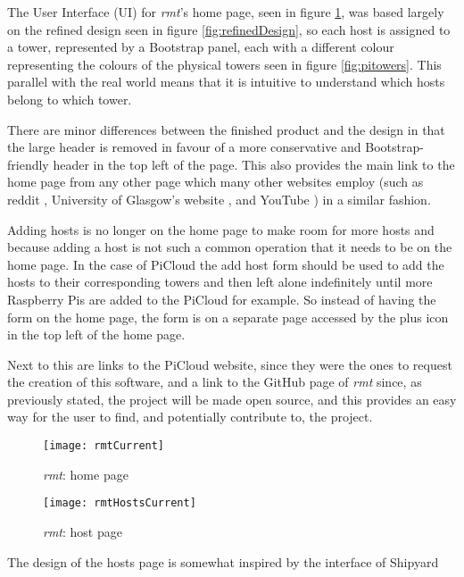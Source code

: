 \label{sec:implUi}
The User Interface (UI) for \emph{rmt}'s home page, seen in figure \ref{fig:rmtCurrent}, was based largely on the refined design seen in figure \ref{fig:refinedDesign}, so each host is assigned to a tower, represented by a Bootstrap panel, each with a different colour representing the colours of the physical towers seen in figure \ref{fig:pitowers}.
This parallel with the real world means that it is intuitive to understand which hosts belong to which tower.

There are minor differences between the finished product and the design in that the large header is removed in favour of a more conservative and Bootstrap-friendly header in the top left of the page.
This also provides the main link to the home page from any other page which many other websites employ (such as reddit \citep{reddit}, University of Glasgow's website \citep{glaWebsite}, and YouTube \citep{youtube}) in a similar fashion.

Adding hosts is no longer on the home page to make room for more hosts and because adding a host is not such a common operation that it needs to be on the home page.
In the case of PiCloud the add host form should be used to add the hosts to their corresponding towers and then left alone indefinitely until more Raspberry Pis are added to the PiCloud for example.
So instead of having the form on the home page, the form is on a separate page accessed by the plus icon in the top left of the home page.

Next to this are links to the PiCloud website, since they were the ones to request the creation of this software, and a link to the GitHub page of \emph{rmt} since, as previously stated, the project will be made open source, and this provides an easy way for the user to find, and potentially contribute to, the project.

\begin{figure}[t]
	\centering
	\texttt{[image: rmtCurrent]}
	\caption{\emph{rmt}: home page}
	\label{fig:rmtCurrent}
\end{figure}

\begin{figure}[t]
	\centering
	\texttt{[image: rmtHostsCurrent]}
	\caption{\emph{rmt}: host page}
	\label{fig:rmtHostCurrent}
\end{figure}

The design of the hosts page is somewhat inspired by the interface of Shipyard
